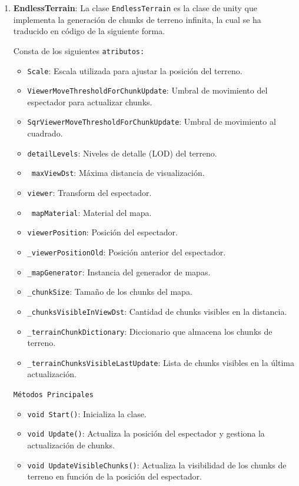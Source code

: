 \begin{enumerate}
    \item \textbf{EndlessTerrain}:
    La clase \texttt{EndlessTerrain} es la clase de unity que implementa la generación de chunks de terreno infinita, la cual se ha traducido en código de la siguiente forma.

    Consta de los siguientes \texttt{atributos:}

    \begin{itemize}
        \item \texttt{Scale}: Escala utilizada para ajustar la posición del terreno.
        \item \texttt{ViewerMoveThresholdForChunkUpdate}: Umbral de movimiento del espectador para actualizar chunks.
        \item \texttt{SqrViewerMoveThresholdForChunkUpdate}: Umbral de movimiento al cuadrado.
        \item \texttt{detailLevels}: Niveles de detalle (LOD) del terreno.
        \item \texttt{ maxViewDst}: Máxima distancia de visualización.
        \item \texttt{viewer}: Transform del espectador.
        \item \texttt{ mapMaterial}: Material del mapa.
        \item \texttt{viewerPosition}: Posición del espectador.
        \item \texttt{\_viewerPositionOld}: Posición anterior del espectador.
        \item \texttt{\_mapGenerator}: Instancia del generador de mapas.
        \item \texttt{\_chunkSize}: Tamaño de los chunks del mapa.
        \item \texttt{\_chunksVisibleInViewDst}: Cantidad de chunks visibles en la distancia.
        \item \texttt{\_terrainChunkDictionary}: Diccionario que almacena los chunks de terreno.
        \item \texttt{\_terrainChunksVisibleLastUpdate}: Lista de chunks visibles en la última actualización.
    \end{itemize}

    \texttt{Métodos Principales}

    \begin{itemize}
        \item \texttt{void Start()}: Inicializa la clase.
        \item \texttt{void Update()}: Actualiza la posición del espectador y gestiona la actualización de chunks.
        \item \texttt{void UpdateVisibleChunks()}: Actualiza la visibilidad de los chunks de terreno en función de la posición del espectador.
    \end{itemize}


\end{enumerate}
